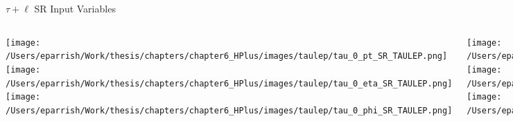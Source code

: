 \documentclass[aspectratio=169,xcolor=table]{beamer}
\begin{document}
    \begin{frame}[t]{$\tau+\ell$ SR Input Variables}
      \begin{columns}[t]
          \texttt{[image: /Users/eparrish/Work/thesis/chapters/chapter6\_HPlus/images/taulep/tau\_0\_pt\_SR\_TAULEP.png]}
          \texttt{[image: /Users/eparrish/Work/thesis/chapters/chapter6\_HPlus/images/taulep/tau\_0\_eta\_SR\_TAULEP.png]}
          \texttt{[image: /Users/eparrish/Work/thesis/chapters/chapter6\_HPlus/images/taulep/tau\_0\_phi\_SR\_TAULEP.png]}

          \texttt{[image: /Users/eparrish/Work/thesis/chapters/chapter6\_HPlus/images/taulep/met\_et\_SR\_TAULEP.png]}
          \texttt{[image: /Users/eparrish/Work/thesis/chapters/chapter6\_HPlus/images/taulep/met\_phi\_SR\_TAULEP.png]}
          \texttt{[image: /Users/eparrish/Work/thesis/chapters/chapter6\_HPlus/images/taulep/jet\_1\_pt\_SR\_TAULEP.png]}

          \texttt{[image: /Users/eparrish/Work/thesis/chapters/chapter6\_HPlus/images/taulep/bjet\_0\_pt\_SR\_TAULEP.png]}
          \texttt{[image: /Users/eparrish/Work/thesis/chapters/chapter6\_HPlus/images/taulep/bjet\_0\_eta\_SR\_TAULEP.png]}
          \texttt{[image: /Users/eparrish/Work/thesis/chapters/chapter6\_HPlus/images/taulep/bjet\_0\_phi\_SR\_TAULEP.png]}

          \texttt{[image: /Users/eparrish/Work/thesis/chapters/chapter6\_HPlus/images/taulep/tau\_0\_upsilon\_SR\_TAULEP.png]}
          \texttt{[image: /Users/eparrish/Work/thesis/chapters/chapter6\_HPlus/images/taulep/tau\_0\_charged\_tracks\_0\_pt\_SR\_TAULEP.png]}

      \end{columns}
    \end{frame}
\end{document}
